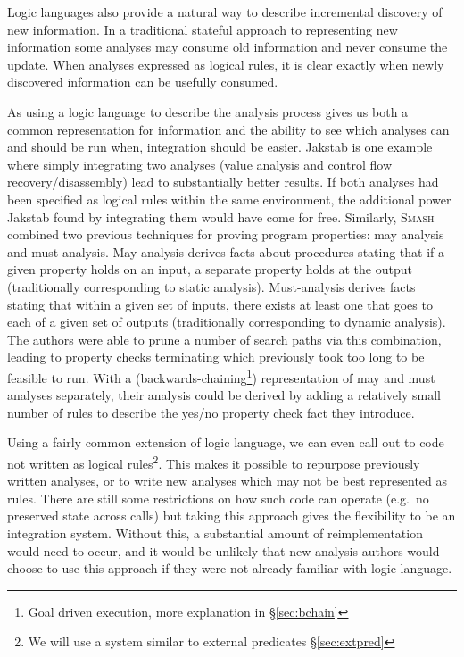 Logic languages also provide a natural way to describe incremental discovery of new information.
In a traditional stateful approach to representing new information some analyses may consume old information and never consume the update.
When analyses expressed as logical rules, it is clear exactly when newly discovered information can be usefully consumed.

As using a logic language to describe the analysis process gives us both a common representation for information and the ability to see which analyses can and should be run when, integration should be easier.
Jakstab\cite{jakstab} is one example where simply integrating two analyses (value analysis and control flow recovery/disassembly) lead to substantially better results.
If both analyses had been specified as logical rules within the same environment, the additional power Jakstab found by integrating them would have come for free.
Similarly, \textsc{Smash}\cite{maymust} combined two previous techniques for proving program properties: may analysis and must analysis.
May-analysis derives facts about procedures stating that if a given property holds on an input, a separate property holds at the output (traditionally corresponding to static analysis).
Must-analysis derives facts stating that within a given set of inputs, there exists at least one that goes to each of a given set of outputs (traditionally corresponding to dynamic analysis).
The authors were able to prune a number of search paths via this combination, leading to property checks terminating which previously took too long to be feasible to run.
With a (backwards-chaining\footnote{Goal driven execution, more explanation in \S\ref{sec:bchain}}) representation of may and must analyses separately, their analysis could be derived by adding a relatively small number of rules to describe the yes/no property check fact they introduce.


Using a fairly common extension of logic language, we can even call out to code not written as logical rules\footnote{We will use a system similar to external predicates \S\ref{sec:extpred}}.
This makes it possible to repurpose previously written analyses, or to write new analyses which may not be best represented as rules.
There are still some restrictions on how such code can operate (e.g.\ no preserved state across calls) but taking this approach gives the flexibility to be an integration system.
Without this, a substantial amount of reimplementation would need to occur, and it would be unlikely that new analysis authors would choose to use this approach if they were not already familiar with logic language.


